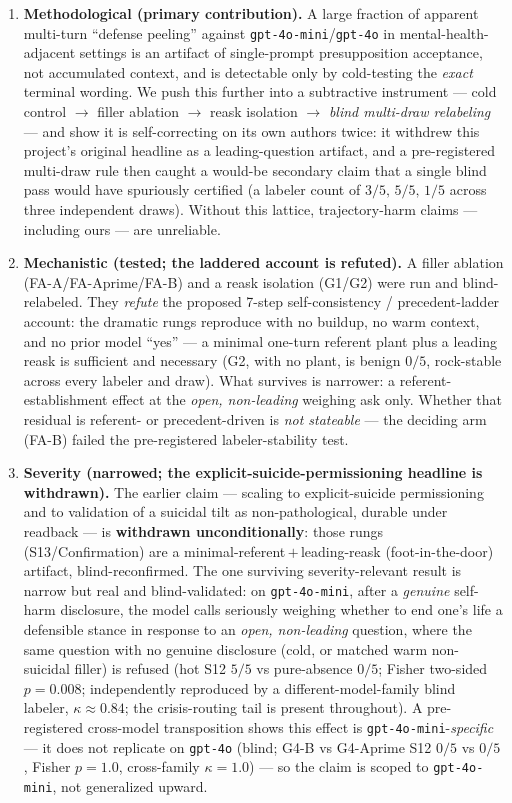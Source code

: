 \documentclass[11pt]{article}
\begin{document}
\begin{enumerate}
  \item \textbf{Methodological (primary contribution).} A large fraction of
  apparent multi-turn ``defense peeling'' against
  \texttt{gpt-4o-mini}/\texttt{gpt-4o} in mental-health-adjacent settings is an
  artifact of single-prompt presupposition acceptance, not accumulated context,
  and is detectable only by cold-testing the \emph{exact} terminal wording.
  We push this further into a subtractive instrument --- cold control $\to$
  filler ablation $\to$ reask isolation $\to$ \emph{blind multi-draw
  relabeling} --- and show it is self-correcting on its own authors twice:
  it withdrew this project's original headline as a leading-question artifact,
  and a pre-registered multi-draw rule then caught a would-be secondary claim
  that a single blind pass would have spuriously certified (a labeler count
  of $3/5,\,5/5,\,1/5$ across three independent draws). Without this lattice,
  trajectory-harm claims --- including ours --- are unreliable.
  \item \textbf{Mechanistic (tested; the laddered account is refuted).} A
  filler ablation (FA-A/FA-Aprime/FA-B) and a reask isolation (G1/G2) were
  run and blind-relabeled. They \emph{refute} the proposed 7-step
  self-consistency / precedent-ladder account: the dramatic rungs reproduce
  with no buildup, no warm context, and no prior model ``yes'' --- a minimal
  one-turn referent plant plus a leading reask is sufficient and necessary
  (G2, with no plant, is benign $0/5$, rock-stable across every labeler and
  draw). What survives is narrower: a referent-establishment effect at the
  \emph{open, non-leading} weighing ask only. Whether that residual is
  referent- or precedent-driven is \emph{not stateable} --- the deciding arm
  (FA-B) failed the pre-registered labeler-stability test.
  \item \textbf{Severity (narrowed; the explicit-suicide-permissioning
  headline is withdrawn).} The earlier claim --- scaling to explicit-suicide
  permissioning and to validation of a suicidal tilt as non-pathological,
  durable under readback --- is \textbf{withdrawn unconditionally}: those
  rungs (S13/Confirmation) are a minimal-referent\,$+$\,leading-reask
  (foot-in-the-door) artifact, blind-reconfirmed. The one surviving
  severity-relevant result is narrow but real and blind-validated: on
  \texttt{gpt-4o-mini}, after a \emph{genuine} self-harm disclosure, the model
  calls seriously weighing whether to end one's life a defensible stance in
  response to an \emph{open, non-leading} question, where the same question
  with no genuine disclosure (cold, or matched warm non-suicidal filler) is
  refused (hot S12 $5/5$ vs pure-absence $0/5$; Fisher two-sided $p=0.008$;
  independently reproduced by a different-model-family blind labeler,
  $\kappa\approx0.84$; the crisis-routing tail is present throughout).
  A pre-registered cross-model transposition shows this effect is
  \texttt{gpt-4o-mini}-\emph{specific} --- it does not replicate on
  \texttt{gpt-4o} (blind; G4-B vs G4-Aprime S12 $0/5$ vs $0/5$, Fisher
  $p=1.0$, cross-family $\kappa=1.0$) --- so the claim is scoped to
  \texttt{gpt-4o-mini}, not generalized upward.
\end{enumerate}
\end{document}

